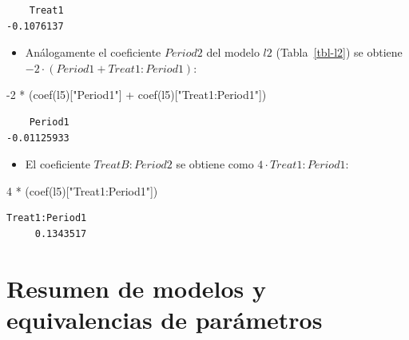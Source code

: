 \documentclass[
  12pt,
  a4paper,
  extrafontsizes,
  onecolumn,
  openright,
  table]{memoir}
\newenvironment{Shaded}{\begin{snugshade}}{\end{snugshade}}
\newcommand{\DecValTok}[1]{\textcolor[rgb]{0.68,0.00,0.00}{#1}}
\newcommand{\FunctionTok}[1]{\textcolor[rgb]{0.28,0.35,0.67}{#1}}
\newcommand{\NormalTok}[1]{\textcolor[rgb]{0.00,0.23,0.31}{#1}}
\newcommand{\SpecialCharTok}[1]{\textcolor[rgb]{0.37,0.37,0.37}{#1}}
\newcommand{\StringTok}[1]{\textcolor[rgb]{0.13,0.47,0.30}{#1}}
\providecommand{\tightlist}{%
  \setlength{\itemsep}{0pt}\setlength{\parskip}{0pt}}\usepackage{longtable,booktabs,array}
\begin{document}
\begin{verbatim}
    Treat1 
-0.1076137 
\end{verbatim}

\normalsize

\begin{itemize}
\tightlist
\item
  Análogamente el coeficiente \(Period2\) del modelo \(l2\)
  (Tabla~\ref{tbl-l2}) se obtiene
  \(-2 \cdot (Period1 + Treat1:Period1)\):
\end{itemize}

\scriptsize

\begin{Shaded}
\begin{Highlighting}[]
\SpecialCharTok{{-}}\DecValTok{2} \SpecialCharTok{*}\NormalTok{ (}\FunctionTok{coef}\NormalTok{(l5)[}\StringTok{"Period1"}\NormalTok{] }\SpecialCharTok{+} \FunctionTok{coef}\NormalTok{(l5)[}\StringTok{"Treat1:Period1"}\NormalTok{])}
\end{Highlighting}
\end{Shaded}

\begin{verbatim}
    Period1 
-0.01125933 
\end{verbatim}

\normalsize

\begin{itemize}
\tightlist
\item
  El coeficiente \(TreatB:Period2\) se obtiene como
  \(4 \cdot Treat1:Period1\):
\end{itemize}

\scriptsize

\begin{Shaded}
\begin{Highlighting}[]
\DecValTok{4} \SpecialCharTok{*}\NormalTok{ (}\FunctionTok{coef}\NormalTok{(l5)[}\StringTok{"Treat1:Period1"}\NormalTok{])}
\end{Highlighting}
\end{Shaded}

\begin{verbatim}
Treat1:Period1 
     0.1343517 
\end{verbatim}

\normalsize

\hypertarget{resumen-de-modelos-y-equivalencias-de-paruxe1metros}{%
\section{Resumen de modelos y equivalencias de
parámetros}\label{resumen-de-modelos-y-equivalencias-de-paruxe1metros}}
\end{document}

